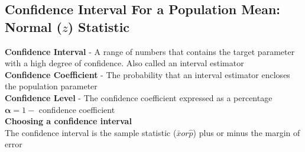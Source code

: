 \documentclass[a4paper]{article}
\let\bf\textbf
\begin{document}
\subsection{Confidence Interval For a Population Mean: Normal ($z$) Statistic}
\bf{Confidence Interval} - A range of numbers that contains the target parameter with a high degree of confidence. Also called an interval estimator\vspace{1mm}\\
\bf{Confidence Coefficient} - The probability that an interval estimator encloses the population parameter\vspace{1mm}\\
\bf{Confidence Level} - The confidence coefficient expressed as a percentage\vspace{1mm}\\
$\boldsymbol{\alpha} = 1 -$ confidence coefficient\vspace{2mm}\\
\bf{Choosing a confidence interval}\\
The confidence interval is the sample statistic ($\bar{x} or \hat{p}$) plus or minus the margin of error
\end{document}
